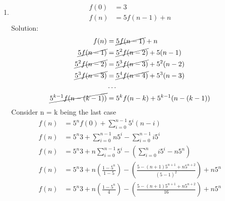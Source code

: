 \documentclass{article}
\begin{document}
\begin{enumerate}
\item
  \begin{align*}
    f(0) &= 3\\
    f(n) &= 5f(n-1) + n
  \end{align*}
  Solution:
  \begin{align*}
    f(n) &= \cancel{5f(n-1)}+n\\ 
    \cancel{5f(n-1)} &= \cancel{5^2f(n-2)} +5(n-1)\\
    \cancel{5^2f(n-2)} &= \cancel{5^3f(n-3)} +5^2(n-2)\\
    \cancel{5^3f(n-3)} &= \cancel{5^4f(n-4)} +5^3(n-3)\\
    &\ldots\\
    \cancel{5^{k-1} f(n-(k-1))} &= {5^kf(n-k)} +5^{k-1}(n-(k-1))\\
  \end{align*}
  Consider n = k being the last case
  \begin{align*}
    f(n) &= {5^nf(0)} + \sum_{i=0}^{n-1}5^i(n-i) \\
    f(n) &= {5^n3} + \sum_{i=0}^{n-1}n5^i - \sum_{i=0}^{n-1}i5^i \\
    f(n) &= {5^n3} + n\sum_{i=0}^{n-1}5^i - (\sum_{i=0}^{n}i5^i -n5^n) \\
    f(n) &= {5^n3} + n(\frac{1-5^n}{ 1 - 5}) - (\frac{5 - (n +1)5^{n+1} +n5^{n+2}}{ (5 - 1)^2})  + n5^n \\
    f(n) &= {5^n3} + n(\frac{1-5^n}{ 4}) - (\frac{5 - (n +1)5^{n+1} +n5^{n+2}}{ 16})  + n5^n \\
  \end{align*}

\end{enumerate}
\end{document}
